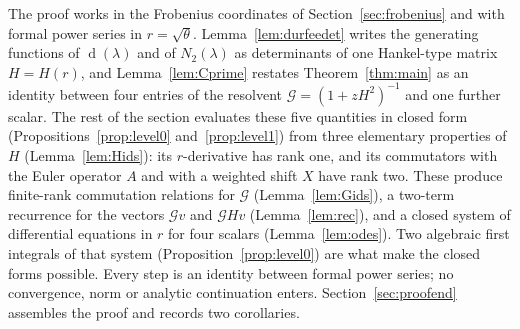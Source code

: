 \documentclass[11pt]{article}
\theoremstyle{definition}
\theoremstyle{remark}
\DeclareMathOperator{\Durfee}{d}
\begin{document}
The proof works in the Frobenius coordinates of Section~\ref{sec:frobenius} and with formal power series in $r=\sqrt\theta$. Lemma~\ref{lem:durfeedet} writes the generating functions of $\Durfee(\lambda)$ and of $N_2(\lambda)$ as determinants of one Hankel-type matrix $H=H(r)$, and Lemma~\ref{lem:Cprime} restates Theorem~\ref{thm:main} as an identity between four entries of the resolvent $\mathcal G=(1+zH^2)^{-1}$ and one further scalar. The rest of the section evaluates these five quantities in closed form (Propositions~\ref{prop:level0} and~\ref{prop:level1}) from three elementary properties of $H$ (Lemma~\ref{lem:Hids}): its $r$-derivative has rank one, and its commutators with the Euler operator $A$ and with a weighted shift $X$ have rank two. These produce finite-rank commutation relations for $\mathcal G$ (Lemma~\ref{lem:Gids}), a two-term recurrence for the vectors $\mathcal Gv$ and $\mathcal GHv$ (Lemma~\ref{lem:rec}), and a closed system of differential equations in $r$ for four scalars (Lemma~\ref{lem:odes}). Two algebraic first integrals of that system (Proposition~\ref{prop:level0}) are what make the closed forms possible. Every step is an identity between formal power series; no convergence, norm or analytic continuation enters. Section~\ref{sec:proofend} assembles the proof and records two corollaries.
\end{document}

